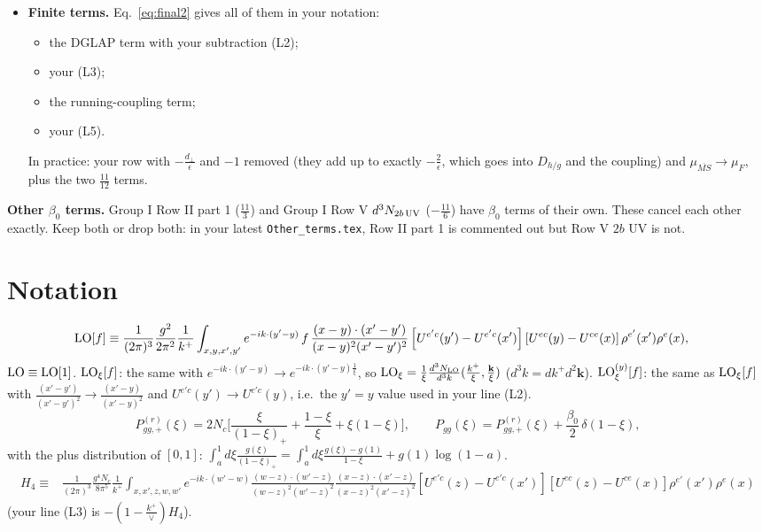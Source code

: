\documentclass[10pt]{article}
\numberwithin{equation}{section}
\newcommand{\new}[1]{{\color{blue}#1}}
\newcommand{\LO}{{\rm LO}}
\begin{document}
\begin{center}
{\begin{minipage}{0.97\textwidth}
\begin{itemize}
\item \textbf{Finite terms.} Eq.~\eqref{eq:final2} gives all of them in your notation:
\begin{itemize}
\item the DGLAP term with your subtraction (L2);
\item your (L3);
\item the running-coupling term;
\item your (L5).
\end{itemize}
In practice: your row with $-\frac{d_\perp}{\epsilon}$ and $-1$ removed (they add up to exactly $-\frac{2}{\epsilon}$, which goes into $D_{h/g}$ and the coupling) and $\mu_{\overline{MS}}\to\mu_F$, plus the two \new{$\frac{11}{12}$} terms.
\end{itemize}
\textbf{Other $\beta_0$ terms.} Group I Row II part 1 ($\frac{11}{3}$) and Group I Row V $d^3N_{2b\,\rm UV}$ ($-\frac{11}{6}$) have $\beta_0$ terms of their own. These cancel each other exactly. Keep both or drop both: in your latest \texttt{Other\_terms.tex}, Row II part 1 is commented out but Row V $2b$ UV is not.
\end{minipage}}\end{center}

\section{Notation}
\begin{align}
\LO[f]&\equiv\frac{1}{(2\pi)^{3}}\frac{g^{2}}{2\pi^{2}}\frac{1}{k^{+}}\int_{x,y,x',y'}e^{-ik\cdot(y'-y)}\,f\,\frac{(x-y)\cdot(x'-y')}{(x-y)^{2}(x'-y')^{2}}\left[U^{e'c}(y')-U^{e'c}(x')\right]\left[U^{ec}(y)-U^{ce}(x)\right]\rho^{e'}(x')\rho^{e}(x),\label{eq:LO}
\end{align}
$\LO\equiv\LO[1]$. $\LO_\xi[f]$: the same with $e^{-ik\cdot(y'-y)}\to e^{-ik\cdot(y'-y)\frac1\xi}$, so $\LO_\xi=\frac1\xi\frac{d^3N_{\rm LO}}{d^3k}(\frac{k^+}{\xi},\frac{\mathbf k}{\xi})$ ($d^3k=dk^+d^2\mathbf k$). $\LO^{(y)}_\xi[f]$: the same as $\LO_\xi[f]$ with $\frac{(x'-y')}{(x'-y')^2}\to\frac{(x'-y)}{(x'-y)^2}$ and $U^{e'c}(y')\to U^{e'c}(y)$, i.e.\ the $y'=y$ value used in your line (L2).
\begin{equation}
P^{(r)}_{gg,+}(\xi)=2N_c\Big[\frac{\xi}{(1-\xi)_+}+\frac{1-\xi}{\xi}+\xi(1-\xi)\Big],\qquad P_{gg}(\xi)=P^{(r)}_{gg,+}(\xi)+\frac{\beta_0}{2}\,\delta(1-\xi),\label{eq:P}
\end{equation}
with the plus distribution of $[0,1]$: $\int_a^1d\xi\frac{g(\xi)}{(1-\xi)_+}=\int_a^1d\xi\frac{g(\xi)-g(1)}{1-\xi}+g(1)\log(1-a)$.
\begin{align}
H_4\equiv{}&\frac{1}{(2\pi)^{3}}\frac{g^{4}N_{c}}{8\pi^{5}}\frac{1}{k^{+}}\int_{x,x',z,w,w'}e^{-ik\cdot(w'-w)}\frac{(w-z)\cdot(w'-z)}{(w-z)^{2}(w'-z)^{2}}\frac{(x-z)\cdot(x'-z)}{(x-z)^{2}(x'-z)^{2}}\left[U^{e'c}(z)-U^{e'c}(x')\right]\left[U^{ec}(z)-U^{ce}(x)\right]\rho^{e'}(x')\rho^{e}(x)\label{eq:H4}
\end{align}
(your line (L3) is $-(1-\frac{k^+}{\vee})H_4$).
\end{document}
